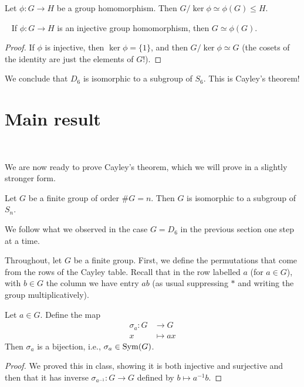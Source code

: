 \documentclass[11pt, reqno]{amsart}
\begin{document}
\begin{thm}
Let $\phi \colon G \to H$ be a group homomorphism.  Then $G/\ker \phi \simeq \phi(G) \leq H$.
\end{thm}

\begin{corollary}~\label{cor:injG}
If $\phi \colon G \to H$ is an injective group homomorphism, then $G \simeq \phi(G)$.
\end{corollary}

\begin{proof}
If $\phi$ is injective, then $\ker \phi =\{1\}$, and then $G/\ker \phi \simeq G$ (the cosets of the identity are just the elements of $G$!).
\end{proof}

We conclude that $D_6$ is isomorphic to a subgroup of $S_6$.  This is Cayley's theorem!  

\section{Main result}~\label{sec:thm}

We are now ready to prove Cayley's theorem, which we will prove in a slightly stronger form.

\begin{thm}[Cayley]  \label{thm:Cayleyn}
Let $G$ be a finite group of order $\#G = n$.  Then $G$ is isomorphic to a subgroup of $S_n$.
\end{thm}

We follow what we observed in the case $G=D_6$ in the previous section one step at a time.

Throughout, let $G$ be a finite group.  First, we define the permutations that come from the rows of the Cayley table.  Recall that in the row labelled $a$ (for $a \in G$), with $b \in G$ the column we have entry $ab$ (as usual suppressing $*$ and writing the group multiplicatively).

\begin{lem}
Let $a \in G$.  Define the map
\begin{align*}
\sigma_a \colon G &\to G \\
x &\mapsto ax
\end{align*}
Then $\sigma_a$ is a bijection, i.e., $\sigma_a \in \operatorname{Sym}(G)$.   
\end{lem}

\begin{proof}
We proved this in class, showing it is both injective and surjective and then that it has inverse $\sigma_{a^{-1}} \colon G \to G$ defined by $b \mapsto a^{-1}b$.
\end{proof}
\end{document}

